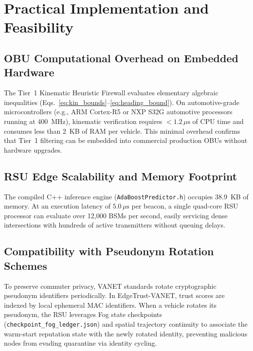 \documentclass[conference]{IEEEtran}
\begin{document}
\section{Practical Implementation and Feasibility}

\subsection{OBU Computational Overhead on Embedded Hardware}

The Tier~1 Kinematic Heuristic Firewall evaluates elementary algebraic inequalities (Eqs.~\ref{eq:kin_bounds}--\ref{eq:heading_bound}). On automotive-grade microcontrollers (e.g., ARM Cortex-R5 or NXP S32G automotive processors running at 400~MHz), kinematic verification requires $<1.2\,\mu\text{s}$ of CPU time and consumes less than 2~KB of RAM per vehicle. This minimal overhead confirms that Tier~1 filtering can be embedded into commercial production OBUs without hardware upgrades.

\subsection{RSU Edge Scalability and Memory Footprint}

The compiled C++ inference engine (\texttt{AdaBoostPredictor.h}) occupies 38.9~KB of memory. At an execution latency of $5.0\,\mu\text{s}$ per beacon, a single quad-core RSU processor can evaluate over 12,000 BSMs per second, easily servicing dense intersections with hundreds of active transmitters without queuing delays.

\subsection{Compatibility with Pseudonym Rotation Schemes}

To preserve commuter privacy, VANET standards rotate cryptographic pseudonym identifiers periodically. In EdgeTrust-VANET, trust scores are indexed by local ephemeral MAC identifiers. When a vehicle rotates its pseudonym, the RSU leverages Fog state checkpoints (\texttt{checkpoint\_fog\_ledger.json}) and spatial trajectory continuity to associate the warm-start reputation state with the newly rotated identity, preventing malicious nodes from evading quarantine via identity cycling.

\end{document}
